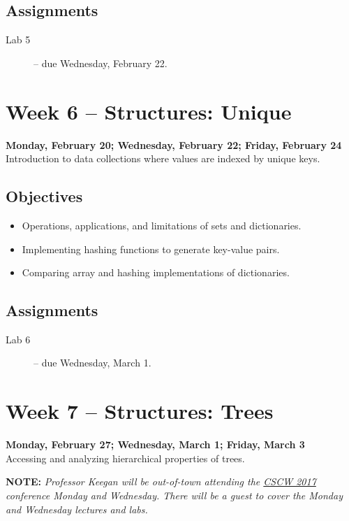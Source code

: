 \documentclass[10pt]{memoir}
\begin{document}
    \subsection{Assignments}
    \begin{description}
        \item[Lab 5 ] -- due Wednesday, February 22.
    \end{description}

\section{Week 6 -- Structures: Unique}
\textcolor{CUGold}{\textbf{Monday, February 20; Wednesday, February 22; Friday, February 24}}\\
Introduction to data collections where values are indexed by unique keys.

    \subsection{Objectives}
    \begin{itemize}
        \item Operations, applications, and limitations of sets and dictionaries.
        \item Implementing hashing functions to generate key-value pairs.
        \item Comparing array and hashing implementations of dictionaries. 
    \end{itemize}

    \subsection{Assignments}
    \begin{description}
        \item[Lab 6 ] -- due Wednesday, March 1. %
    \end{description}
    
\section{Week 7 -- Structures: Trees}
\textcolor{CUGold}{\textbf{Monday, February 27; Wednesday, March 1; Friday, March 3}}\\
Accessing and analyzing hierarchical properties of trees. 

\textbf{NOTE:} \textit{Professor Keegan will be out-of-town attending the \href{https://cscw.acm.org/2017/}{CSCW 2017} conference Monday and Wednesday. There will be a guest to cover the Monday and Wednesday lectures and labs.}
\end{document}
